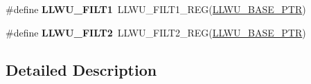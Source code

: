 \begin{DoxyCompactItemize}
\item 
\hypertarget{group___l_l_w_u___register___accessor___macros_ga0ccd44a49b9f822b80e5d8c4935d94fe}{}\#define {\bfseries L\+L\+W\+U\+\_\+\+F\+I\+L\+T1}~L\+L\+W\+U\+\_\+\+F\+I\+L\+T1\+\_\+\+R\+E\+G(\hyperlink{group___l_l_w_u___peripheral_ga89c97b9e8756088cb3d8617c022ae6ac}{L\+L\+W\+U\+\_\+\+B\+A\+S\+E\+\_\+\+P\+T\+R})\label{group___l_l_w_u___register___accessor___macros_ga0ccd44a49b9f822b80e5d8c4935d94fe}

\item 
\hypertarget{group___l_l_w_u___register___accessor___macros_gae5e6484abe7ce06b0e85852c098959e7}{}\#define {\bfseries L\+L\+W\+U\+\_\+\+F\+I\+L\+T2}~L\+L\+W\+U\+\_\+\+F\+I\+L\+T2\+\_\+\+R\+E\+G(\hyperlink{group___l_l_w_u___peripheral_ga89c97b9e8756088cb3d8617c022ae6ac}{L\+L\+W\+U\+\_\+\+B\+A\+S\+E\+\_\+\+P\+T\+R})\label{group___l_l_w_u___register___accessor___macros_gae5e6484abe7ce06b0e85852c098959e7}

\end{DoxyCompactItemize}


\subsection{Detailed Description}
